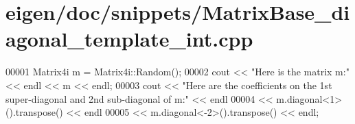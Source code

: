 \hypertarget{eigen_2doc_2snippets_2_matrix_base__diagonal__template__int_8cpp_source}{}\section{eigen/doc/snippets/\+Matrix\+Base\+\_\+diagonal\+\_\+template\+\_\+int.cpp}
\label{eigen_2doc_2snippets_2_matrix_base__diagonal__template__int_8cpp_source}

\begin{DoxyCode}
00001 Matrix4i m = Matrix4i::Random();
00002 cout << \textcolor{stringliteral}{"Here is the matrix m:"} << endl << m << endl;
00003 cout << \textcolor{stringliteral}{"Here are the coefficients on the 1st super-diagonal and 2nd sub-diagonal of m:"} << endl
00004      << m.diagonal<1>().transpose() << endl
00005      << m.diagonal<-2>().transpose() << endl;
\end{DoxyCode}
